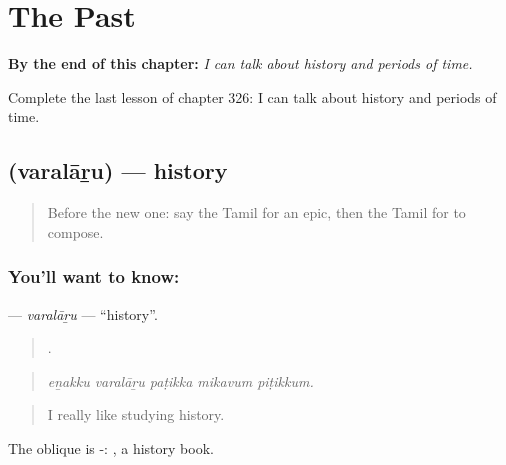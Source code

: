 
\chapter{The Past}
\label{ch:ta-the-past}

\begin{chapteropening}
\textbf{By the end of this chapter:} \emph{I can talk about history and periods of time.}

Complete the last lesson of chapter 326: I can talk about history and periods of time.
\end{chapteropening}

\section[\texorpdfstring{\ta{வரலாறு} (varalāṟu)}{வரலாறு (varalāṟu)}]{ (varalāṟu) — history}

\label{lesson:TA-C326-varalaru}



\begin{quote}
Before the new one: say the Tamil for an epic, then the Tamil for to compose.
\end{quote}

\subsection*{You'll want to know: }
\textbf{} — \emph{varalāṟu} — \textquotedblleft{}history\textquotedblright{}.

\begin{quote}
    .
\end{quote}

\begin{quote}
\emph{eṉakku varalāṟu paṭikka mikavum piṭikkum.}
\end{quote}

\begin{quote}
I really like studying history.
\end{quote}

The oblique is -:  , a history book.

